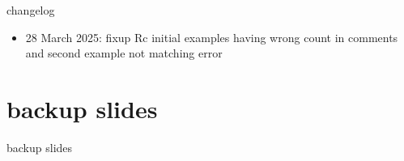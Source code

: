 \graphicspath{{./figures/}}
\title{}
\usepackage[outputdir=latex.out]{minted}
\date{}

\begin{frame}
    \titlepage
\end{frame}


{\changelogmode
\begin{frame}{changelog}
\begin{itemize}
\item 28 March 2025: fixup Rc initial examples having wrong count in comments
   and second example not matching error
\end{itemize}
\end{frame}
}



\section{backup slides}
\begin{frame}{backup slides}
\end{frame}



